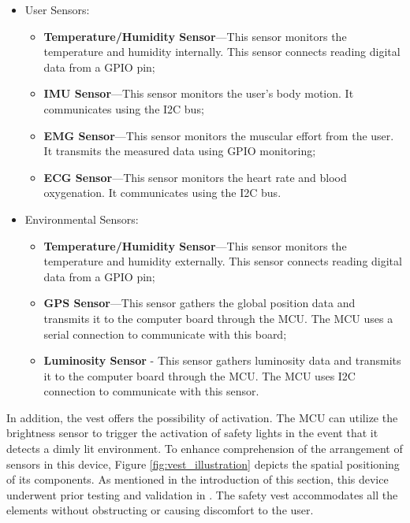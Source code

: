 \begin{itemize}
    \item User Sensors:\vspace{-6pt}
    \begin{itemize}
        \item \textbf{Temperature/Humidity Sensor}---This sensor monitors the temperature and humidity internally. This sensor connects reading digital data from a GPIO pin;
        \item \textbf{IMU Sensor}---This sensor monitors the user's body motion. It communicates using the I2C bus;
        \item \textbf{EMG Sensor}---This sensor monitors the muscular effort from the user. It transmits the measured data using GPIO monitoring;
        \item \textbf{ECG Sensor}---This sensor monitors the heart rate and blood oxygenation. It communicates using the I2C bus.
    \end{itemize}\vspace{-6pt}
    \item Environmental Sensors:\vspace{-6pt}
    \begin{itemize}
        \item \textbf{Temperature/Humidity Sensor}---This sensor monitors the temperature and humidity externally. This sensor connects reading digital data from a GPIO pin;
        \item \textbf{GPS Sensor}---This sensor gathers the global position data and transmits it to the computer board through the MCU. The MCU uses a serial connection to communicate with this board;
        \item \textbf{Luminosity Sensor} - This sensor gathers luminosity data and transmits it to the computer board through the MCU. The MCU uses I2C connection to communicate with this sensor.
    \end{itemize}
\end{itemize}\vspace{-6pt}

In addition, the vest offers the possibility of activation. The MCU can utilize the brightness sensor to trigger the activation of safety lights in the event that it detects a dimly lit environment. To enhance comprehension of the arrangement of sensors in this device, Figure \ref{fig:vest_illustration} depicts the spatial positioning of its components. As mentioned in the introduction of this section, this device underwent prior testing and validation in \cite{jp2019software}. The safety vest accommodates all the elements without obstructing or causing discomfort to the user.

